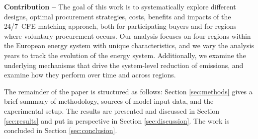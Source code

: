 
\textbf{Contribution --} The goal of this work is to systematically explore different designs, optimal procurement strategies, costs, benefits and impacts of the 24/7~CFE matching approach, both for participating buyers and for regions where voluntary procurement occurs.
Our analysis focuses on four regions within the European energy system with unique characteristics, and we vary the analysis years to track the evolution of the energy system.
Additionally, we examine the underlying mechanisms that drive the system-level reduction of \co emissions, and examine how they perform over time and across regions.


The remainder of the paper is structured as follows: Section \cref{sec:methods} gives a brief summary of methodology, sources of model input data, and the experimental setup. The results are presented and discussed in Section \cref{sec:results} and put in perspective in Section \cref{sec:discussion}. The work is concluded in Section \cref{sec:conclusion}.



